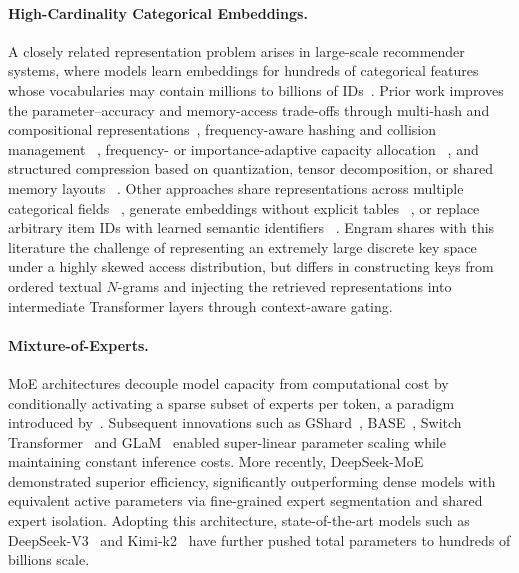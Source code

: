 \paragraph{High-Cardinality Categorical Embeddings.}
A closely related representation problem arises in large-scale recommender systems, where models learn embeddings for hundreds of categorical features whose vocabularies may contain millions to billions of IDs~\citep{coleman2023unified}.
Prior work improves the parameter--accuracy and memory-access trade-offs through multi-hash and compositional representations~\citep{tito2017hash,shi2020compositional},
frequency-aware hashing and collision management
~\citep{zhang2020model,tsang2022clustering,zhang2024cafe},
frequency- or importance-adaptive capacity allocation
~\citep{ginart2021mixed,joglekar2020neural,liu2021learnable},
and structured compression based on quantization, tensor decomposition,
or shared memory layouts
~\citep{kang2020learning,yin2021tt,desai2021random}.
Other approaches share representations across multiple categorical fields
~\citep{coleman2023unified}, generate embeddings without explicit tables
~\citep{kang2021learning}, or replace arbitrary item IDs with learned
semantic identifiers
~\citep{rajput2023recommender,singh2024better}.
Engram shares with this literature the challenge of representing an
extremely large discrete key space under a highly skewed access
distribution, but differs in constructing keys from ordered textual
$N$-grams and injecting the retrieved representations into intermediate
Transformer layers through context-aware gating.

\paragraph{Mixture-of-Experts.} MoE architectures decouple model capacity from computational cost by conditionally activating a sparse subset of experts per token, a paradigm introduced by~\citet{shazeer2017outrageously}. Subsequent innovations such as GShard~\citep{lepikhin2020gshard}, BASE~\citep{pmlr-v139-lewis21a}, Switch Transformer~\citep{fedus2022switch} and GLaM~\citep{du2022glam} enabled super-linear parameter scaling while maintaining constant inference costs. More recently, DeepSeek-MoE~\citep{dai2024deepseekmoe} demonstrated superior efficiency, significantly outperforming dense models with equivalent active parameters via fine-grained expert segmentation and shared expert isolation. Adopting this architecture, state-of-the-art models such as DeepSeek-V3~\citep{liu2024deepseek} and Kimi-k2~\citep{kimi-k2} have further pushed total parameters to hundreds of billions scale.
 
